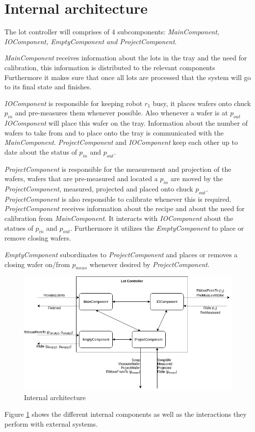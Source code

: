 \section{Internal architecture}
The lot controller will comprises of 4 subcomponents: \textit{MainComponent, IOComponent, EmptyComponent and ProjectComponent}.

\textit{MainComponent} receives information about the lots in the tray and the need for calibration, this information is distributed to the relevant components Furthermore it makes sure that once all lots are processed that the system will go to its final state and finishes.

\textit{IOComponent} is responsible for keeping robot $r_1$ busy, it places wafers onto chuck $p_{in}$ and pre-measures them whenever possible. Also whenever a wafer is at $p_{out}$ \textit{IOComponent} will place this wafer on the tray. Information about the number of wafers to take from and to place onto the tray is communicated with the \textit{MainComponent}. \textit{ProjectComponent} and \textit{IOComponent} keep each other up to date about the status of $p_{in}$ and $p_{out}$.

\textit{ProjectComponent} is responsible for the measurement and projection of the wafers, wafers that are pre-measured and located a $p_{in}$ are moved by the \textit{ProjectComponent}, measured, projected and placed onto chuck $p_{out}$. \textit{ProjectComponent} is also responsible to calibrate whenever this is required. \textit{ProjectComponent} receives information about the recipe and about the need for calibration from \textit{MainComponent}. It interacts with \textit{IOComponent} about the statues of $p_{in}$ and $p_{out}$. Furthermore it utilizes the \textit{EmptyComponent} to place or remove closing wafers.

\textit{EmptyComponent} subordinates to \textit{ProjectComponent} and places or removes a closing wafer on/from $p_{meas}$ whenever desired by \textit{ProjectComponent}.\\

\begin{figure}
	\includegraphics[width=\textwidth]{img/internal_architecture.png}
    \caption{Internal architecture}
    \label{fig:internal_arch}
\end{figure}
Figure \ref{fig:internal_arch} shows the different internal components as well as the interactions they perform with external systems. 

